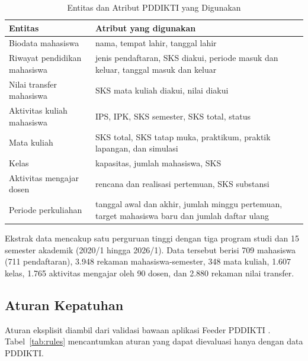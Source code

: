 \documentclass[conference]{IEEEtran}
\begin{document}
\begin{table}[htbp]
\caption{Entitas dan Atribut PDDIKTI yang Digunakan}
\begin{center}
\begin{tabular}{L{0.27\columnwidth}L{0.61\columnwidth}}
\toprule
\textbf{Entitas} & \textbf{Atribut yang digunakan} \\
\midrule
Biodata mahasiswa & nama, tempat lahir, tanggal lahir \\
Riwayat pendidikan mahasiswa & jenis pendaftaran, SKS diakui, periode masuk dan keluar, tanggal masuk dan keluar \\
Nilai transfer mahasiswa & SKS mata kuliah diakui, nilai diakui \\
Aktivitas kuliah mahasiswa & IPS, IPK, SKS semester, SKS total, status \\
Mata kuliah & SKS total, SKS tatap muka, praktikum, praktik lapangan, dan simulasi \\
Kelas & kapasitas, jumlah mahasiswa, SKS \\
Aktivitas mengajar dosen & rencana dan realisasi pertemuan, SKS substansi \\
Periode perkuliahan & tanggal awal dan akhir, jumlah minggu pertemuan, target mahasiswa baru dan jumlah daftar ulang \\
\bottomrule
\end{tabular}
\label{tab:data}
\end{center}
\end{table}

Ekstrak data mencakup satu perguruan tinggi dengan tiga program studi dan 15 semester akademik (2020/1 hingga 2026/1). Data tersebut berisi 709 mahasiswa (711 pendaftaran), 3.948 rekaman mahasiswa-semester, 348 mata kuliah, 1.607 kelas, 1.765 aktivitas mengajar oleh 90 dosen, dan 2.880 rekaman nilai transfer.

\subsection{Aturan Kepatuhan}
{\raggedright Aturan eksplisit diambil dari validasi bawaan aplikasi Feeder PDDIKTI \cite{feeder_guide}. Tabel~\ref{tab:rules} mencantumkan aturan yang dapat dievaluasi hanya dengan data PDDIKTI.\par}
\end{document}
